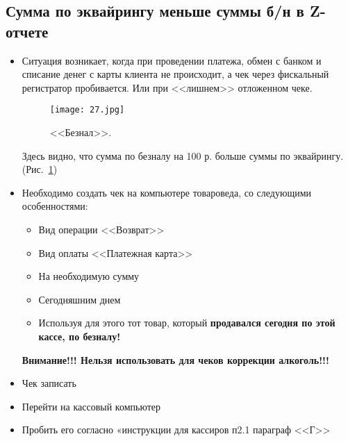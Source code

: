 \subsection{Сумма по эквайрингу меньше суммы б/н в Z-отчете}


\begin{itemize}	
	\item Ситуация возникает, когда при проведении платежа, обмен с банком и списание денег с карты клиента не происходит, а чек через фискальный регистратор пробивается. Или при <<лишнем>> отложенном чеке.
	
	

	
	\begin{figure}[H]
		\texttt{[image: 27.jpg]}
		\caption{<<Безнал>>.}
		\label{ris:27.jpg}
	\end{figure}
	Здесь видно, что сумма по безналу на 100 р. больше суммы по эквайрингу.  (Рис.~\ref{ris:27.jpg})
	\item Необходимо создать чек на компьютере товароведа, со следующими особенностями:
	\begin{itemize}[label={--}]
		\item Вид операции <<Возврат>>
		\item Вид оплаты <<Платежная карта>>
		\item На необходимую сумму
		\item Сегодняшним днем
	    \item Используя для этого тот товар, который \textbf{продавался сегодня по этой кассе, по безналу!} 
	\end{itemize}



	\begin{warning}
	\textbf{Внимание!!! Нельзя использовать для чеков коррекции алкоголь!!!}
	\end{warning}
	
	\item Чек записать
	\item Перейти на кассовый компьютер 	
	\item Пробить его согласно «инструкции для кассиров п2.1 параграф <<Г>>
		
    
	
\end{itemize}
